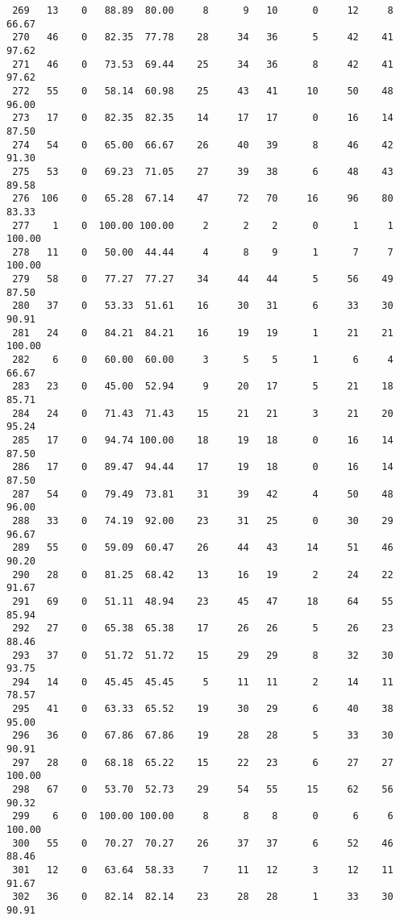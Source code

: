\begin{verbatim}
 269   13    0   88.89  80.00     8      9   10      0     12     8    66.67
 270   46    0   82.35  77.78    28     34   36      5     42    41    97.62
 271   46    0   73.53  69.44    25     34   36      8     42    41    97.62
 272   55    0   58.14  60.98    25     43   41     10     50    48    96.00
 273   17    0   82.35  82.35    14     17   17      0     16    14    87.50
 274   54    0   65.00  66.67    26     40   39      8     46    42    91.30
 275   53    0   69.23  71.05    27     39   38      6     48    43    89.58
 276  106    0   65.28  67.14    47     72   70     16     96    80    83.33
 277    1    0  100.00 100.00     2      2    2      0      1     1   100.00
 278   11    0   50.00  44.44     4      8    9      1      7     7   100.00
 279   58    0   77.27  77.27    34     44   44      5     56    49    87.50
 280   37    0   53.33  51.61    16     30   31      6     33    30    90.91
 281   24    0   84.21  84.21    16     19   19      1     21    21   100.00
 282    6    0   60.00  60.00     3      5    5      1      6     4    66.67
 283   23    0   45.00  52.94     9     20   17      5     21    18    85.71
 284   24    0   71.43  71.43    15     21   21      3     21    20    95.24
 285   17    0   94.74 100.00    18     19   18      0     16    14    87.50
 286   17    0   89.47  94.44    17     19   18      0     16    14    87.50
 287   54    0   79.49  73.81    31     39   42      4     50    48    96.00
 288   33    0   74.19  92.00    23     31   25      0     30    29    96.67
 289   55    0   59.09  60.47    26     44   43     14     51    46    90.20
 290   28    0   81.25  68.42    13     16   19      2     24    22    91.67
 291   69    0   51.11  48.94    23     45   47     18     64    55    85.94
 292   27    0   65.38  65.38    17     26   26      5     26    23    88.46
 293   37    0   51.72  51.72    15     29   29      8     32    30    93.75
 294   14    0   45.45  45.45     5     11   11      2     14    11    78.57
 295   41    0   63.33  65.52    19     30   29      6     40    38    95.00
 296   36    0   67.86  67.86    19     28   28      5     33    30    90.91
 297   28    0   68.18  65.22    15     22   23      6     27    27   100.00
 298   67    0   53.70  52.73    29     54   55     15     62    56    90.32
 299    6    0  100.00 100.00     8      8    8      0      6     6   100.00
 300   55    0   70.27  70.27    26     37   37      6     52    46    88.46
 301   12    0   63.64  58.33     7     11   12      3     12    11    91.67
 302   36    0   82.14  82.14    23     28   28      1     33    30    90.91

\end{verbatim}
